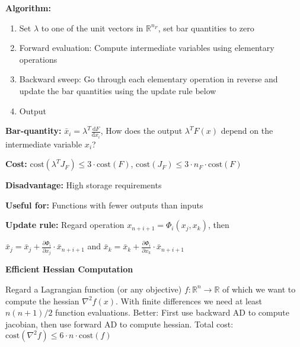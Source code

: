 \begin{tcolorbox}[colback=orange!5!white, %
  colframe=orange!75!black, %
  title=\textbf{Calculating Derivatives}]
\textbf{Algorithm:}
\begin{enumerate}
	\item Set $\lambda$ to one of the unit vectors in $\mathbb{R}^{n_F}$, set bar quantities to zero
	\item Forward evaluation: Compute intermediate variables using elementary operations
	\item Backward sweep: Go through each elementary operation in reverse and update the bar quantities using the update rule below
	\item Output 
\end{enumerate}
\textbf{Bar-quantity:} $\bar{x}_i = \lambda^T\frac{\text{d}F}{\text{d}x_i}$, \grqq How does the output $\lambda^TF(x)$ depend on the intermediate variable $x_i$?\grqq

\textbf{Cost:} $\text{cost}(\lambda^TJ_F) \leq 3 \cdot \text{cost}(F)$, 
$\text{cost}(J_F) \leq 3 \cdot n_F \cdot \text{cost}(F)$

\textbf{Disadvantage:} High storage requirements

\textbf{Useful for:} Functions with fewer outputs than inputs

\textbf{Update rule:} Regard operation $x_{n+i+1} = \Phi_i(x_j,x_k)$, then
\begin{center}
	\vspace{-0.1cm}
	$\bar{x}_j = \bar{x}_j + \frac{\partial \Phi_i}{\partial x_j} \cdot \bar{x}_{n+i+1}$ and
	$\bar{x}_k = \bar{x}_k + \frac{\partial \Phi_i}{\partial x_k} \cdot \bar{x}_{n+i+1}$
\end{center}

\begin{center}
	\vspace{-0.1cm}
	\textbf{Efficient Hessian Computation}
	\vspace{-0.2cm}
\end{center}
Regard a Lagrangian function (or any objective) $f:\mathbb{R}^n \to \mathbb{R}$ of which we want to compute the hessian $\nabla^2 f(x)$. With finite differences we need at least $n(n+1)/2$ function evaluations. Better: First use backward AD to compute jacobian, then use forward AD to compute hessian. Total cost: $\text{cost}(\nabla^2 f) \leq 6 \cdot n \cdot \text{cost}(f)$
\end{tcolorbox}

